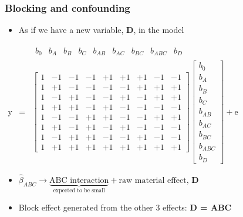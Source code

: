 \begin{frame}\frametitle{Blocking and confounding}
	\begin{itemize}
		\item	As if we have a new variable, \textbf{D}, in the model
	\end{itemize}

	$
	\begin{array}{rcl}
		& &
		\begin{matrix}
			b_0 & b_A & b_B & b_{C} & b_{AB} & b_{AC}& b_{BC} &b_{ABC} & b_{D}
		\end{matrix}
		\\
		\mathrm{y} &=&
		\begin{bmatrix}
			1 & -1 & -1 & -1 & +1 & +1 & +1 & -1 & -1\\
			1 & +1 & -1 & -1 & -1 & -1 & +1 & +1 & +1\\
			1 & -1 & +1 & -1 & -1 & +1 & -1 & +1 & +1\\
			1 & +1 & +1 & -1 & +1 & -1 & -1 & -1 & -1\\
			1 & -1 & -1 & +1 & +1 & -1 & -1 & +1 & +1\\
			1 & +1 & -1 & +1 & -1 & +1 & -1 & -1 & -1\\
			1 & -1 & +1 & +1 & -1 & -1 & +1 & -1 & -1\\
			1 & +1 & +1 & +1 & +1 & +1 & +1 & +1 & +1
		\end{bmatrix}
		\begin{bmatrix}
			b_0 \\
			b_A \\
			b_B \\
			b_{C} \\
			b_{AB} \\
			b_{AC} \\
			b_{BC} \\
			b_{ABC} \\
			b_{D}
		\end{bmatrix}
		+ \mathrm{e}
	\end{array}
	$
	\begin{itemize}
		\item	$\widehat{\beta}_{ABC} \rightarrow \underbrace{\text{ABC interaction}}_{\text{expected to be small}} + \text{raw material effect, }\mathbf{D}$
		\item	Block effect generated from the other 3 effects: \textbf{D = ABC}
	\end{itemize}
\end{frame}


